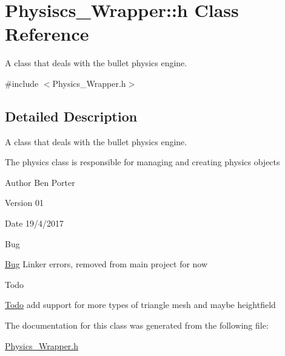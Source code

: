 \hypertarget{class_physiscs___wrapper_1_1h}{}\section{Physiscs\+\_\+\+Wrapper\+:\+:h Class Reference}
\label{class_physiscs___wrapper_1_1h}


A class that deals with the bullet physics engine.  




{\ttfamily \#include $<$Physics\+\_\+\+Wrapper.\+h$>$}



\subsection{Detailed Description}
A class that deals with the bullet physics engine. 

The physics class is responsible for managing and creating physics objects

\begin{DoxyAuthor}{Author}
Ben Porter 
\end{DoxyAuthor}
\begin{DoxyVersion}{Version}
01 
\end{DoxyVersion}
\begin{DoxyDate}{Date}
19/4/2017 
\end{DoxyDate}
\begin{DoxyRefDesc}{Bug}
\item[\hyperlink{bug__bug000007}{Bug}]Linker errors, removed from main project for now \end{DoxyRefDesc}
\begin{DoxyRefDesc}{Todo}
\item[\hyperlink{todo__todo000004}{Todo}]add support for more types of triangle mesh and maybe heightfield \end{DoxyRefDesc}


The documentation for this class was generated from the following file\+:\begin{DoxyCompactItemize}
\item 
\hyperlink{_physics___wrapper_8h}{Physics\+\_\+\+Wrapper.\+h}\end{DoxyCompactItemize}

